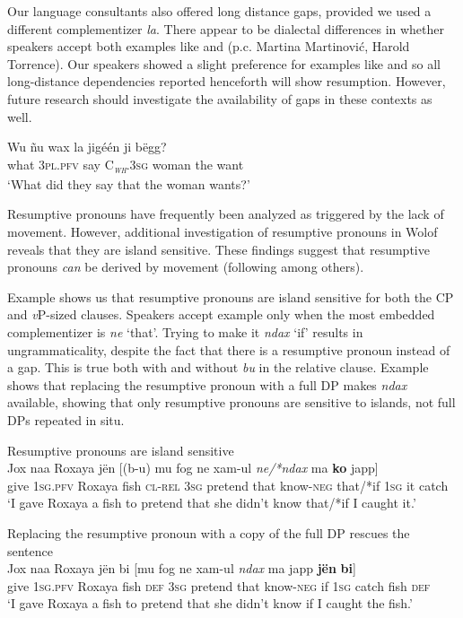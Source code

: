 \documentclass[output=paper]{langscibook}
\begin{document}
Our language consultants also offered long distance gaps, provided we used a different complementizer \emph{la}. There appear to be dialectal differences in whether speakers accept both examples like  and  (p.c. Martina Martinovi\'c, Harold Torrence). Our speakers showed a slight preference for examples like  and so all long-distance dependencies reported henceforth will show resumption. However, future research should investigate the availability of gaps in these contexts as well.

\begin{exe}
	\ex \label{ex:newman:longgap}
	\gll Wu \~nu wax la jig\'e\'en ji b\"egg?\\
	what \textsc{3pl.pfv} say \textsc{C\textsubscript{\normalfont\textit{wh}}.3sg} woman the want\\
	\trans `What did they say that the woman wants?' 
\end{exe}

Resumptive pronouns have frequently been analyzed as triggered by the lack of movement. However, additional investigation of resumptive pronouns in Wolof reveals that they are island sensitive. These findings suggest that resumptive pronouns \emph{can} be derived by movement (following \citealt{sichel:2014} among others).

Example  shows us that resumptive pronouns are island sensitive for both the CP and \textit{v}P-sized clauses. Speakers accept example  only when the most embedded complementizer is \emph{ne} `that'. Trying to make it \emph{ndax} `if' results in ungrammaticality, despite the fact that there is a resumptive pronoun instead of a gap. This is true both with and without \emph{bu} in the relative clause. Example  shows that replacing the resumptive pronoun with a full DP makes \emph{ndax} available, showing that only resumptive pronouns are sensitive to islands, not full DPs repeated in situ. 

\begin{exe}
	\ex \label{ex:newman:island} Resumptive pronouns are island sensitive\\
	\gll Jox naa Roxaya j\"en [(b-u) mu fog ne xam-ul \emph{ne/*ndax} ma \textbf{ko} japp] \\
	give \textsc{1sg.pfv} Roxaya fish \textsc{cl-rel} \textsc{3sg} pretend that know-\textsc{neg} that/*if \textsc{1sg} it catch \\
	\trans `I gave Roxaya a fish to pretend that she didn't know that/*if I caught it.'

	\ex \label{ex:newman:rescue} Replacing the resumptive pronoun with a copy of the full DP rescues the sentence\\
	\gll Jox naa Roxaya j\"en bi [mu fog ne xam-ul \emph{ndax} ma japp \textbf{j\"en} \textbf{bi}] \\
	give \textsc{1sg.pfv} Roxaya fish \textsc{def} \textsc{3sg} pretend that know-\textsc{neg} if \textsc{1sg} catch fish \textsc{def} \\
	\trans `I gave Roxaya a fish to pretend that she didn't know if I caught the fish.'
\end{exe}
\end{document}
